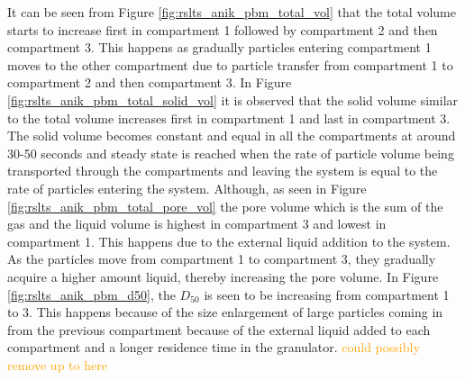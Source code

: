 \par It can be seen from Figure \ref{fig:rslts_anik_pbm_total_vol} that the total volume starts to increase first in compartment 1 followed by compartment 2 and then compartment 3. This happens as gradually particles entering compartment 1 moves to the other compartment due to particle transfer from compartment 1 to compartment 2 and then compartment 3. In Figure \ref{fig:rslts_anik_pbm_total_solid_vol} it is observed that the solid volume similar to the total volume increases first in compartment 1 and last in compartment 3. The solid volume becomes constant and equal in all the compartments at around 30-50 seconds and steady state is reached when the rate of particle volume being transported through the compartments and leaving the system is equal to the rate of particles entering the system. Although, as seen in Figure \ref{fig:rslts_anik_pbm_total_pore_vol} the pore volume which is the sum of the gas and the liquid volume is highest in compartment 3 and lowest in compartment 1. This happens due to the external liquid addition to the system. As the particles move from compartment 1 to compartment 3, they gradually acquire a higher amount liquid, thereby increasing the pore volume. In Figure \ref{fig:rslts_anik_pbm_d50}, the $D_50$ is seen to be increasing from compartment 1 to 3. This happens because of the size enlargement of large particles coming in from the previous compartment because of the external liquid added to each compartment and a longer residence time in the granulator.
\textcolor{orange}{could possibly remove up to here}


